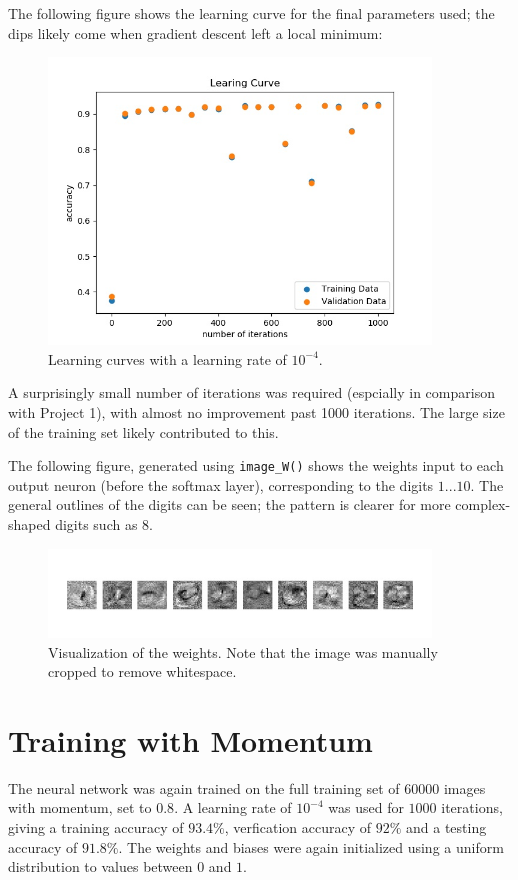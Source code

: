 \documentclass{article}
\begin{document}
   The following figure shows the learning curve for the final parameters used; the dips likely
   come when gradient descent left a local minimum:
     \begin{figure}[H] \centering
         \includegraphics[width=4in]{resources/part4_main}
         \caption{Learning curves with a learning rate of $10^{-4}$. }
      \end{figure}
   A surprisingly small number of iterations was required (espcially in comparison with Project 1), with almost no
   improvement past 1000 iterations. The large size of the training set likely contributed to this.


  The following figure, generated using \texttt{image\_W()} shows the weights input to each
  output neuron (before the softmax layer), corresponding to the digits $1...10$. The general outlines
  of the digits can be seen; the pattern is clearer for more complex-shaped digits such as 8.
     \begin{figure}[H] \centering
         \includegraphics[width=4in]{resources/part4_weights}
         \caption{Visualization of the weights. Note that the image was manually cropped to remove whitespace. }
      \end{figure}





   \section{Training with Momentum}
   The neural network was again trained on the full training set of $60000$ images with momentum, set to $0.8$.
   A learning rate of $10^{-4}$ was used for $1000$ iterations, giving a training accuracy of $93.4\%$,
   verfication accuracy of $92\%$ and a testing accuracy of $91.8\%$.
   The weights and biases were again initialized using a uniform distribution to values between $0$ and $1$.
\end{document}
